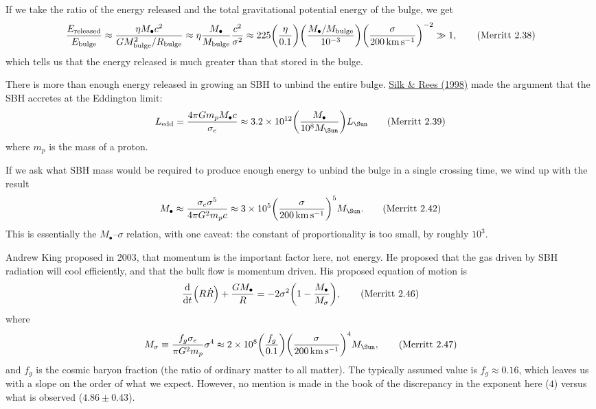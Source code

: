 \documentclass[degn-notes.tex]{subfiles}
\begin{document}
If we take the ratio of the energy released and the total gravitational potential energy of the bulge, we get
%
\begin{displaymath}
  \frac{E_{\mathrm{released}}}{E_{\mathrm{bulge}}} \approx
  \frac{\eta M_\bullet c^2}{G M_{\mathrm{bulge}}^2 / R_{\mathrm{bulge}}} \approx
  \eta \frac{M_\bullet}{M_{\mathrm{bulge}}} \frac{c^2}{\sigma^2} \approx
  225
  \qty(\frac{\eta}{0.1})
  \qty(\frac{M_\bullet / M_{\mathrm{bulge}}}{10^{-3}})
  \qty(\frac{\sigma}{\SI{200}{\kilo\meter\per\second}})^{-2} \gg
  1,
%
  \tag{Merritt 2.38}
  \label{merritt:2.38}
\end{displaymath}
%
which tells us that the energy released is much greater than that stored in the bulge.

There is more than enough energy released in growing an SBH to unbind the entire bulge.
\href{http://articles.adsabs.harvard.edu/cgi-bin/nph-iarticle_query?1998A%26A...331L...1S&amp;data_type=PDF_HIGH&amp;whole_paper=YES&amp;type=PRINTER&amp;filetype=.pdf}{Silk \& Rees (1998)}
made the argument that the SBH accretes at the Eddington limit:
%
\begin{displaymath}
  L_{\mathrm{edd}} =
  \frac{4 \pi G m_p M_\bullet c}{\sigma_e} \approx
  \num{3.2e12} \qty(\frac{M_\bullet}{10^8 M_\Sun}) L_\Sun
%
  \tag{Merritt 2.39}
  \label{merritt:2.39}
\end{displaymath}
where $m_p$ is the mass of a proton.

If we ask what SBH mass would be required to produce enough energy to unbind the bulge in a single crossing time, we wind up with the result
%
\begin{displaymath}
  M_\bullet \approx
  \frac{\sigma_e \sigma^5}{4 \pi G^2 m_p c} \approx
  \num{3e5} \qty(\frac{\sigma}{\SI{200}{\kilo\meter\per\second}})^5 M_\Sun.
%
  \tag{Merritt 2.42}
  \label{merritt:2.42}
\end{displaymath}
%
This is essentially the $M_\bullet$--$\sigma$ relation, with one caveat: the constant of proportionality is too small, by roughly $10^3$.

Andrew King proposed in 2003, that momentum is the important factor here, not energy. He proposed that the gas driven by SBH radiation will cool efficiently, and that the bulk flow is momentum driven. His proposed equation of motion is
%
\begin{displaymath}
  \dv{t}(R \dot{R}) + \frac{G M_\bullet}{R} =
  -2 \sigma^2 \qty( 1 - \frac{M_\bullet}{M_\sigma} ),
%
  \tag{Merritt 2.46}
  \label{merritt:2.46}
\end{displaymath}
%
where
%
\begin{displaymath}
  M_\sigma \equiv
  \frac{f_g \sigma_e}{\pi G^2 m_p} \sigma^4 \approx
  \num{2e8}
  \qty(\frac{f_g}{0.1})
  \qty(\frac{\sigma}{\SI{200}{\kilo\meter\per\second}})^4
  M_\Sun,
%
  \tag{Merritt 2.47}
  \label{merritt:2.47}
\end{displaymath}
%
and $f_g$ is the cosmic baryon fraction (the ratio of ordinary matter to all matter). The typically assumed value is $f_g \approx 0.16$, which leaves us with a slope on the order of what we expect. However, no mention is made in the book of the discrepancy in the exponent here ($4$) versus what is observed ($4.86\pm0.43$).
\end{document}
